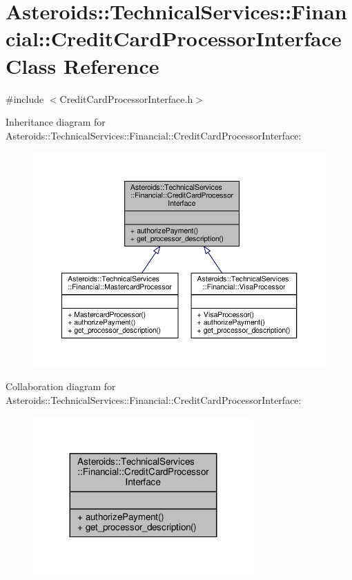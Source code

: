 \hypertarget{classAsteroids_1_1TechnicalServices_1_1Financial_1_1CreditCardProcessorInterface}{}\section{Asteroids\+:\+:Technical\+Services\+:\+:Financial\+:\+:Credit\+Card\+Processor\+Interface Class Reference}
\label{classAsteroids_1_1TechnicalServices_1_1Financial_1_1CreditCardProcessorInterface}


{\ttfamily \#include $<$Credit\+Card\+Processor\+Interface.\+h$>$}



Inheritance diagram for Asteroids\+:\+:Technical\+Services\+:\+:Financial\+:\+:Credit\+Card\+Processor\+Interface\+:\nopagebreak
\begin{figure}[H]
\begin{center}
\leavevmode
\includegraphics[width=350pt]{classAsteroids_1_1TechnicalServices_1_1Financial_1_1CreditCardProcessorInterface__inherit__graph}
\end{center}
\end{figure}


Collaboration diagram for Asteroids\+:\+:Technical\+Services\+:\+:Financial\+:\+:Credit\+Card\+Processor\+Interface\+:\nopagebreak
\begin{figure}[H]
\begin{center}
\leavevmode
\includegraphics[width=239pt]{classAsteroids_1_1TechnicalServices_1_1Financial_1_1CreditCardProcessorInterface__coll__graph}
\end{center}
\end{figure}
